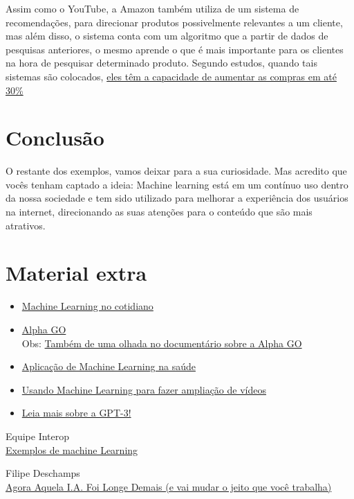 \documentclass[12pt]{article}
\begin{document}
    Assim como o YouTube, a Amazon também utiliza de um sistema de recomendações, 
    para direcionar produtos possivelmente relevantes a um cliente, mas além 
    disso, o sistema conta com um algoritmo que a partir de dados de pesquisas
    anteriores, o mesmo aprende o que é mais importante para os clientes na 
    hora de pesquisar determinado produto. Segundo estudos, quando tais 
    sistemas são colocados, 
    \href{https://papers.ssrn.com/sol3/papers.cfm?abstract_id=2263983}{eles têm a capacidade de aumentar as compras em até 30\%}


    \newpage
    \section{Conclusão}
    O restante dos exemplos, vamos deixar para a sua curiosidade. Mas acredito que vocês tenham captado a ideia: Machine learning está em um contínuo uso dentro da nossa sociedade e tem sido utilizado para melhorar a 
    experiência dos usuários na internet, direcionando as suas atenções para o conteúdo que são mais atrativos.


    \newpage
    \section{Material extra}\label{sec:extra} %

    \begin{itemize}
        \item \href{http://datascienceacademy.com.br/blog/17-casos-de-uso-de-machine-learning/}{Machine Learning no cotidiano}
        \item \href{https://deepmind.com/research/case-studies/alphago-the-story-so-far}{Alpha GO} \\ Obs: \href{https://youtu.be/WXuK6gekU1Y}{Também de uma olhada no documentário sobre a Alpha GO}
        \item \href{https://youtu.be/uGYJuOyIvzs}{Aplicação de Machine Learning na saúde}
        \item \href{https://youtu.be/AwmvwTopbas}{Usando Machine Learning para fazer ampliação de vídeos}
        \item \href{https://forbes.com.br/forbes-insider/2020/07/por-que-o-programa-de-inteligencia-artificial-gpt-3-e-incrivel-mas-superestimado/}{Leia mais sobre a GPT-3!}
    \end{itemize}

    \newpage

    \begin{thebibliography}{2}
        Equipe Interop \\
        \href{https://www.interop.com.br/blog/exemplos-de-machine-learning/}{Exemplos de machine Learning} 
        
        Filipe Deschamps \\
        \href{https://www.interop.com.br/blog/exemplos-de-machine-learning/}{Agora Aquela I.A. Foi Longe Demais (e vai mudar o jeito que você trabalha)} 
    \end{thebibliography}

    
\end{document}
